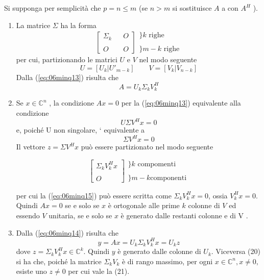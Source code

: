 \begin{thproof} 
Si supponga per semplicit\`a che $p = n \leq m$ (se $n
> m$ si sostituisce $A$ a con $A^{H}$ ).
\begin{enumerate}
\item La matrice $\Sigma$ ha la forma
$$
\left[
\begin{array}{lll} \Sigma_{k} & & O \\ & & \\ O & & O
\end{array} \right]
\begin{array}{l} \} k \text{ righe} \\ \\ \}m-k \text{ righe}
\end{array}
$$
per cui, partizionando le matrici $U$ e $V$ nel modo seguente
$$U = [U_k | U'_{m−k} ] \qquad V = [V_k | V_{n−k} ]$$
Dalla (\ref{eq:06minq13}) risulta che
\begin{equation}
  \label{eq:06minq14} A = U_k \Sigma_k V_k^{H}
\end{equation}

\item Se $x \in \mathbb{C}^n$ , la condizione $Ax = 0$ per la
(\ref{eq:06minq13}) equivalente alla condizione
$$U \Sigma V^{H} x = 0$$
e, poich\'e U non singolare, ` equivalente a
\begin{equation}
  \label{eq:06minq15} \Sigma V^H x = 0
\end{equation} Il vettore $z = \Sigma V^H x$ pu\`o essere partizionato
nel modo seguente

\begin{equation}
  \label{eq:06minq16} \left[
\begin{array}{l} \Sigma_{k}V_k^{H}x \\ \\ O
\end{array} \right]
\begin{array}{l} \} k \text{ compomenti} \\ \\ \}m-k \text{
componenti}
\end{array}
\end{equation}

per cui la (\ref{eq:06minq15}) pu\`o essere scritta come $\Sigma_k
V_k^{H} x = 0$, ossia $V_k^{H} x = 0$.  Quindi $Ax = 0$ se e solo se
$x$ \`e ortogonale alle prime $k$ colonne di $V$ ed essendo $V$
unitaria, se e solo se $x$ \`e generato dalle restanti colonne e di V
.

\item Dalla (\ref{eq:06minq14}) risulta che
\begin{equation}
  \label{eq:06minq17} y=Ax = U_k \Sigma_k V_k^{H}x = U_kz
\end{equation} dove $z = \Sigma_k V_k^{H}x \in \mathbb{C}^{k}$. Quindi
$y$ \`e generato dalle colonne di $U_k$. Viceversa (20) si ha che,
poich\'e la matrice $\Sigma_kV_k$ \`e di rango massimo, per ogni $x
\in \mathbb{C}^{n} , x \neq 0, $ esiste uno $z \neq 0$ per cui vale la
(21).


\end{enumerate}
\end{thproof}
